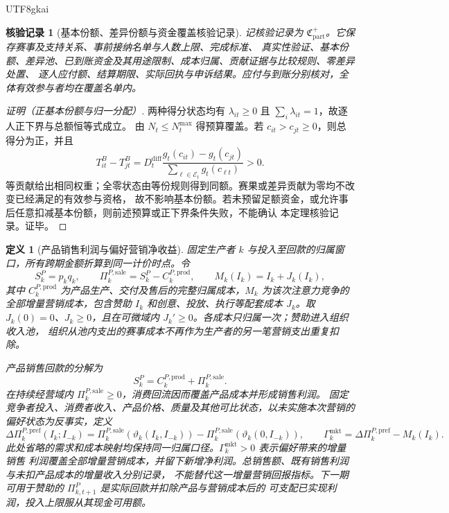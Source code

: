 \documentclass[12pt,a4paper,openany]{report}
\newtheorem{definition}{定义}[chapter]
\newtheorem{Certificate}{核验记录}[chapter]
\begin{document}
\begin{CJK*}{UTF8}{gkai}
\begin{Certificate}[基本份额、差异份额与资金覆盖核验记录]
\label{cert:base-differential-coverage}
记核验记录为 \(\mathfrak C_{\mathrm{part}}^+\)。它保存赛事及支持关系、事前接纳名单与人数上限、完成标准、
真实性验证、基本份额、差异池、已到账资金及其用途限制、成本归属、贡献证据与比较规则、零差异处置、
逐人应付额、结算期限、实际回执与申诉结果。应付与到账分别核对，全体有效参与者均在覆盖名单内。
\end{Certificate}

\begin{proof}[证明（正基本份额与归一分配）]
两种得分状态均有 \(\lambda_{it}\ge0\) 且 \(\sum_i\lambda_{it}=1\)，故逐人正下界与总额恒等式成立。
由 \(N_t\le N_t^{\max}\) 得预算覆盖。若 \(c_{it}>c_{jt}\ge0\)，则总得分为正，并且
\[
  T_{it}^B-T_{jt}^B
  =D_t^{\mathrm{diff}}
    \frac{g_t(c_{it})-g_t(c_{jt})}{\sum_{\ell\in\mathcal E_t}g_t(c_{\ell t})}>0.
\]
等贡献给出相同权重；全零状态由等份规则得到同额。赛果或差异贡献为零均不改变已经满足的有效参与资格，
故不影响基本份额。若未预留足额资金，或允许事后任意扣减基本份额，则前述预算或正下界条件失败，不能确认
本定理核验记录。证毕。
\end{proof}

\begin{definition}[产品销售利润与偏好营销净收益]
\label{def:preference-marketing-return}
固定生产者 \(k\) 与投入至回款的归属窗口，所有跨期金额折算到同一计价时点。令
\[
  S_k^P=p_kq_k,\qquad
  \Pi_k^{P,\mathrm{sale}}=S_k^P-C_k^{P,\mathrm{prod}},\qquad
  M_k(I_k)=I_k+J_k(I_k),
\]
其中 \(C_k^{P,\mathrm{prod}}\) 为产品生产、交付及售后的完整归属成本，\(M_k\) 为该次注意力竞争的
全部增量营销成本，包含赞助 \(I_k\) 和创意、投放、执行等配套成本 \(J_k\)。取
\(J_k(0)=0\)、\(J_k\ge0\)，且在可微域内 \(J_k'\ge0\)。各成本只归属一次；赞助进入组织收入池，
组织从池内支出的赛事成本不再作为生产者的另一笔营销支出重复扣除。

产品销售回款的分解为
\[
  S_k^P=C_k^{P,\mathrm{prod}}+\Pi_k^{P,\mathrm{sale}}.
\]
在持续经营域内 \(\Pi_k^{P,\mathrm{sale}}\ge0\)，消费回流因而覆盖产品成本并形成销售利润。
固定竞争者投入、消费者收入、产品价格、质量及其他可比状态，以未实施本次营销的偏好状态为反事实，定义
\[
  \Delta\Pi_k^{P,\mathrm{pref}}(I_k;I_{-k})
  =\Pi_k^{P,\mathrm{sale}}(\vartheta_k(I_k,I_{-k}))
   -\Pi_k^{P,\mathrm{sale}}(\vartheta_k(0,I_{-k})),
  \qquad
  \Gamma_k^{\mathrm{mkt}}=\Delta\Pi_k^{P,\mathrm{pref}}-M_k(I_k).
\]
此处省略的需求和成本映射均保持同一归属口径。\(\Gamma_k^{\mathrm{mkt}}>0\) 表示偏好带来的增量销售
利润覆盖全部增量营销成本，并留下新增净利润。总销售额、既有销售利润与未扣产品成本的增量收入分别记录，
不能替代这一增量营销回报指标。下一期可用于赞助的 \(\Pi_{k,t+1}^P\) 是实际回款并扣除产品与营销成本后的
可支配已实现利润，投入上限服从其现金可用额。
\end{definition}


\end{CJK*}
\end{document}
